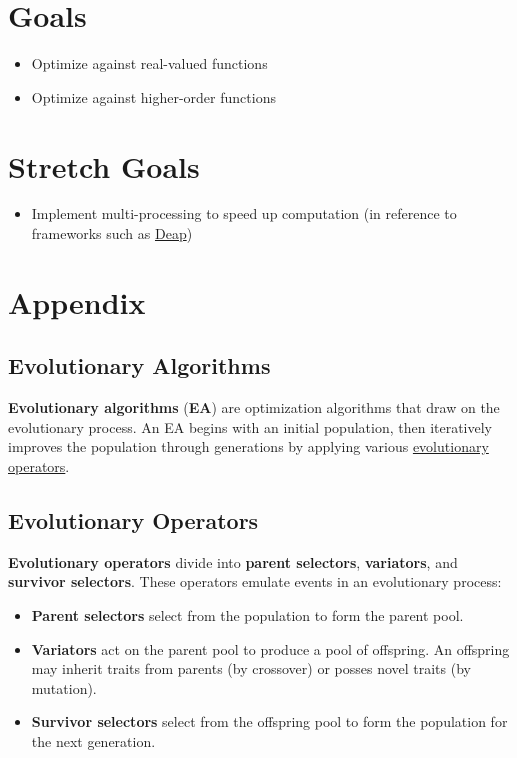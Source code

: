\documentclass{article}
\begin{document}
\section{Goals}
\begin{itemize}
    \item Optimize against real-valued functions
    \item Optimize against higher-order functions
\end{itemize}

\section{Stretch Goals}

\begin{itemize}
    \item Implement multi-processing to speed up computation (in reference to frameworks such as \href{https://deap.readthedocs.io/en/master/}{Deap})
\end{itemize}
\section{Appendix}

\subsection{Evolutionary Algorithms}
\label{sec:evalg}
\textbf{Evolutionary algorithms} (\textbf{EA}) are optimization algorithms that draw on the evolutionary process. An EA begins with an initial population, then iteratively improves the population through generations by applying various \hyperref[sec:evop]{evolutionary operators}.

\subsection{Evolutionary Operators}
\label{sec:evop}
\textbf{Evolutionary operators} divide into \textbf{parent selectors}, \textbf{variators}, and \textbf{survivor selectors}. These operators emulate events in an evolutionary process:

\begin{itemize}
    \item \textbf{Parent selectors} select from the population to form the parent pool.
    \item \textbf{Variators} act on the parent pool to produce a pool of offspring. An offspring may inherit traits from parents (by crossover) or posses novel traits (by mutation).
    \item \textbf{Survivor selectors} select from the offspring pool to form the population for the next generation.
\end{itemize}
\end{document}
